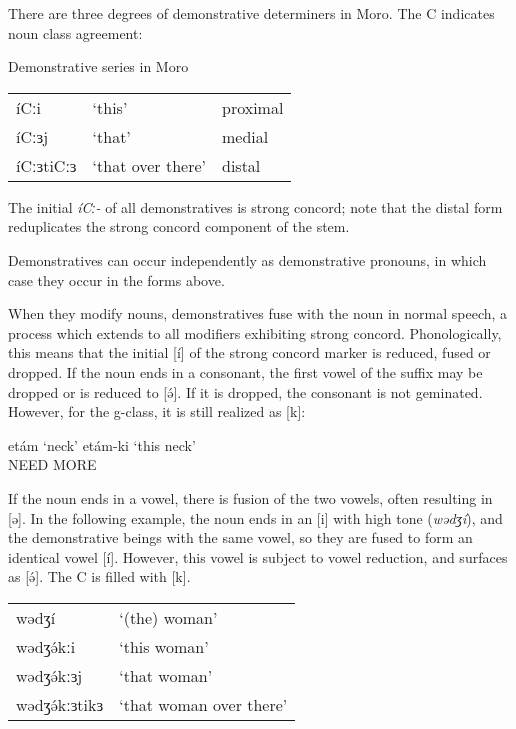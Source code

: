There are three degrees of demonstrative determiners in Moro. The C indicates noun class agreement:

\ea Demonstrative series in Moro\\
\begin{tabular}[t]{lll}
	íCːi		&`this’	 			&proximal\\
	íCːɜj		&`that’	 			&medial\\
	íCːɜtiCːɜ	&`that over there’	&distal\\
	\end{tabular}
\z %
The initial \textit{íCː-} of all demonstratives is strong concord; note that the distal form reduplicates the strong concord component of the stem.

Demonstratives can occur independently as demonstrative pronouns, in which case they occur in the forms above.

When they modify nouns, demonstratives fuse with the noun in normal speech, a process which extends to all modifiers exhibiting strong concord. Phonologically, this means that the initial [í] of the strong concord marker is reduced, fused or dropped. If the noun ends in a consonant, the first vowel of the suffix may be dropped or is reduced to [ə́]. If it is dropped, the consonant is not geminated. However, for the g-class, it is still realized as [k]:

\ea		etám	`neck’		etám-ki	`this neck’	\\
		NEED MORE \z 

If the noun ends in a vowel, there is fusion of the two vowels, often resulting in [ə]. In the following example, the noun ends in an [i] with high tone (\textit{wədʒí}), and the demonstrative beings with the same vowel, so they are fused to form an identical vowel [í]. However, this vowel is subject to vowel reduction, and surfaces as [ə́]. The C is filled with [k]. 

\ea \begin{tabular}[t]{ll}
	wədʒí		&	`(the) woman’ \\
	wədʒə́kːi	&	`this woman’\\
	wədʒə́kːɜj	& 	`that woman’\\
	wədʒə́kːɜtikɜ &		`that woman over there’\\
	\end{tabular}
\z 


